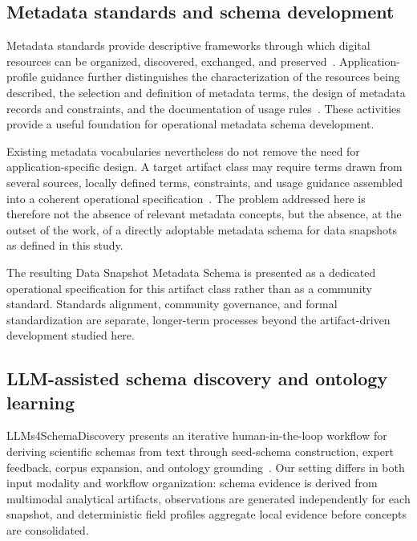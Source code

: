 \documentclass{article}
\begin{document}
\subsection{Metadata standards and schema development}

Metadata standards provide descriptive frameworks through which digital resources can be organized, discovered, exchanged, and preserved~\citep{gilliland2008}. Application-profile guidance further distinguishes the characterization of the resources being described, the selection and definition of metadata terms, the design of metadata records and constraints, and the documentation of usage rules~\citep{coyle2009applicationprofiles}. These activities provide a useful foundation for operational metadata schema development.

Existing metadata vocabularies nevertheless do not remove the need for application-specific design. A target artifact class may require terms drawn from several sources, locally defined terms, constraints, and usage guidance assembled into a coherent operational specification~\citep{greenberg2005,coyle2009applicationprofiles}. The problem addressed here is therefore not the absence of relevant metadata concepts, but the absence, at the outset of the work, of a directly adoptable metadata schema for data snapshots as defined in this study.

The resulting Data Snapshot Metadata Schema is presented as a dedicated operational specification for this artifact class rather than as a community standard. Standards alignment, community governance, and formal standardization are separate, longer-term processes beyond the artifact-driven development studied here.

\subsection{LLM-assisted schema discovery and ontology learning}

LLMs4SchemaDiscovery presents an iterative human-in-the-loop workflow for deriving scientific schemas from text through seed-schema construction, expert feedback, corpus expansion, and ontology grounding~\citep{sadruddin2025schemadiscovery}. Our setting differs in both input modality and workflow organization: schema evidence is derived from multimodal analytical artifacts, observations are generated independently for each snapshot, and deterministic field profiles aggregate local evidence before concepts are consolidated.
\end{document}

